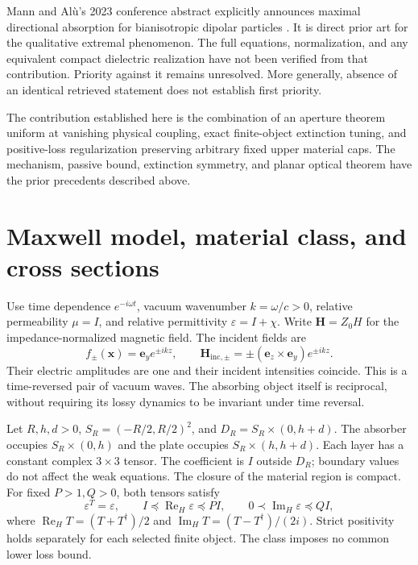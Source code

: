 \documentclass[11pt]{article}
\newcommand{\ReH}{\operatorname{Re}_{\!H}}
\newcommand{\ImH}{\operatorname{Im}_{\!H}}
\newcommand{\ey}{\mathbf e_y}
\newcommand{\ez}{\mathbf e_z}
\begin{document}
Mann and Al\`u's 2023 conference abstract explicitly announces maximal directional absorption for bianisotropic dipolar particles \citep{MannAlu2023}. It is direct prior art for the qualitative extremal phenomenon. The full equations, normalization, and any equivalent compact dielectric realization have not been verified from that contribution. Priority against it remains unresolved. More generally, absence of an identical retrieved statement does not establish first priority.

The contribution established here is the combination of an aperture theorem uniform at vanishing physical coupling, exact finite-object extinction tuning, and positive-loss regularization preserving arbitrary fixed upper material caps. The mechanism, passive bound, extinction symmetry, and planar optical theorem have the prior precedents described above.

\section{Maxwell model, material class, and cross sections}\label{sec:model}
Use time dependence $e^{-i\omega t}$, vacuum wavenumber $k=\omega/c>0$, relative permeability $\mu=I$, and relative permittivity $\varepsilon=I+\chi$. Write $\mathbf H=Z_0H$ for the impedance-normalized magnetic field. The incident fields are
\begin{equation}\label{eq:incident}
 f_\pm(\mathbf x)=\ey e^{\pm ikz},\qquad
 \mathbf H_{\mathrm{inc},\pm}=\pm(\ez\times\ey)e^{\pm ikz}.
\end{equation}
Their electric amplitudes are one and their incident intensities coincide. This is a time-reversed pair of vacuum waves. The absorbing object itself is reciprocal, without requiring its lossy dynamics to be invariant under time reversal.

Let $R,h,d>0$, $S_R=(-R/2,R/2)^2$, and $D_R=S_R\times(0,h+d)$. The absorber occupies $S_R\times(0,h)$ and the plate occupies $S_R\times(h,h+d)$. Each layer has a constant complex $3\times3$ tensor. The coefficient is $I$ outside $D_R$; boundary values do not affect the weak equations. The closure of the material region is compact. For fixed $P>1,Q>0$, both tensors satisfy
\begin{equation}\label{eq:material}
 \varepsilon^T=\varepsilon,\qquad
 I\preceq\ReH\varepsilon\preceq PI,\qquad
 0\prec\ImH\varepsilon\preceq QI,
\end{equation}
where $\ReH T=(T+T^\dagger)/2$ and $\ImH T=(T-T^\dagger)/(2i)$. Strict positivity holds separately for each selected finite object. The class imposes no common lower loss bound.
\end{document}
